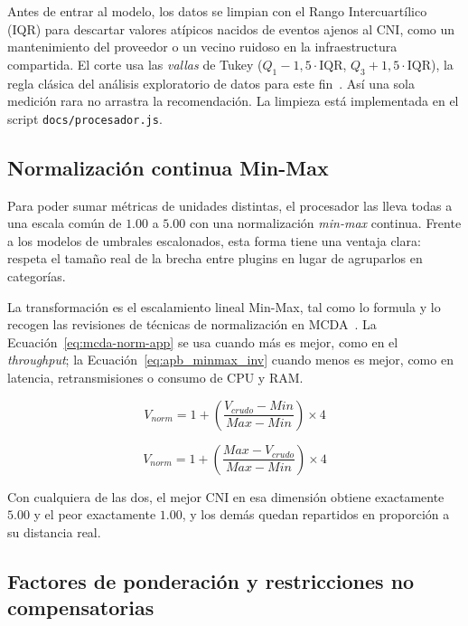 Antes de entrar al modelo, los datos se limpian con el Rango Intercuartílico (IQR) para descartar valores atípicos nacidos de eventos ajenos al CNI, como un mantenimiento del proveedor o un vecino ruidoso en la infraestructura compartida. El corte usa las \emph{vallas} de Tukey ($Q_1 - 1{,}5\cdot\text{IQR}$, $Q_3 + 1{,}5\cdot\text{IQR}$), la regla clásica del análisis exploratorio de datos para este fin~\cite{ref32}. Así una sola medición rara no arrastra la recomendación. La limpieza está implementada en el script \texttt{docs/procesador.js}.

\subsection{Normalización continua Min-Max} \label{sec:apb_umbrales}

Para poder sumar métricas de unidades distintas, el procesador las lleva todas a una escala común de $1.00$ a $5.00$ con una normalización \emph{min-max} continua. Frente a los modelos de umbrales escalonados, esta forma tiene una ventaja clara: respeta el tamaño real de la brecha entre plugins en lugar de agruparlos en categorías.

La transformación es el escalamiento lineal Min-Max, tal como lo formula \cite{ref35} y lo recogen las revisiones de técnicas de normalización en MCDA~\cite{ref36}. La Ecuación~\eqref{eq:mcda-norm-app} se usa cuando más es mejor, como en el \emph{throughput}; la Ecuación~\eqref{eq:apb_minmax_inv} cuando menos es mejor, como en latencia, retransmisiones o consumo de CPU y RAM.

\begin{equation}
  V_{norm} = 1 + \left( \frac{V_{crudo} - Min}{Max - Min} \right) \times 4
  \label{eq:mcda-norm-app}
\end{equation}

\begin{equation}
  V_{norm} = 1 + \left( \frac{Max - V_{crudo}}{Max - Min} \right) \times 4
  \label{eq:apb_minmax_inv}
\end{equation}

Con cualquiera de las dos, el mejor CNI en esa dimensión obtiene exactamente $5.00$ y el peor exactamente $1.00$, y los demás quedan repartidos en proporción a su distancia real.

\subsection{Factores de ponderación y restricciones no compensatorias} \label{sec:apb_ponderaciones}

